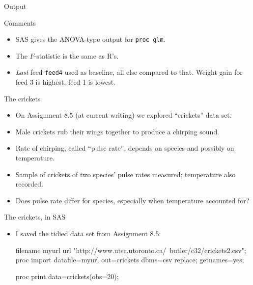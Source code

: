 \documentclass[unknownkeysallowed]{beamer}\usepackage[]{graphicx}\usepackage[]{color}
\begin{document}
\begin{frame}[fragile]{Output}
  
  
\end{frame}

\begin{frame}[fragile]{Comments}
  
  \begin{itemize}
  \item SAS gives the ANOVA-type output for \texttt{proc glm}.
  \item The $F$-statistic is the same as R's.
  \item \emph{Last} feed \texttt{feed4} used as baseline, all else
    compared to that. Weight gain for feed 3 is highest, feed 1 is lowest.
  \end{itemize}
  
\end{frame}

\begin{frame}[fragile]{The crickets}
  
  \begin{itemize}
  \item On Assignment 8.5 (at current writing) we explored ``crickets''
    data set.
  \item Male crickets rub their wings together to produce a chirping
    sound. 
  \item Rate of chirping, called ``pulse rate'', depends on species
    and possibly on temperature.
  \item Sample of crickets of two species' pulse rates measured;
    temperature also recorded.
  \item Does pulse rate differ for species, especially when
    temperature accounted for?
  \end{itemize}
\end{frame}

\begin{frame}[fragile]{The crickets, in SAS}
  
  \begin{itemize}
  \item I saved the tidied data set from Assignment 8.5:
    
    \begin{Sascode}[store=siqet]
filename myurl url 
  "http://www.utsc.utoronto.ca/~butler/c32/crickets2.csv";      
proc import
  datafile=myurl
  out=crickets
  dbms=csv
  replace;
  getnames=yes;
  
proc print data=crickets(obs=20);
    \end{Sascode}
  \end{itemize}
  
\end{frame}
\end{document}
